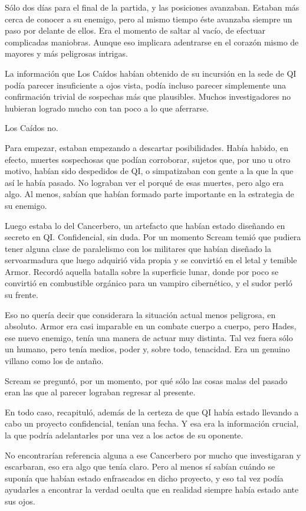 Sólo dos días para el final de la partida, y las posiciones avanzaban. Estaban más cerca de conocer a su enemigo, pero al mismo tiempo éste avanzaba siempre un paso por delante de ellos. Era el momento de saltar al vacío, de efectuar complicadas maniobras. Aunque eso implicara adentrarse en el corazón mismo de mayores y más peligrosas intrigas.

\fancyparbreak
La información que Los Caídos habían obtenido de su incursión en la sede de QI podía parecer insuficiente a ojos vista, podía incluso parecer simplemente una confirmación trivial de sospechas más que plausibles. Muchos investigadores no hubieran logrado mucho con tan poco a lo que aferrarse.

Los Caídos no.

Para empezar, estaban empezando a descartar posibilidades. Había habido, en efecto, muertes sospechosas que podían corroborar, sujetos que, por uno u otro motivo, habían sido despedidos de QI, o simpatizaban con gente a la que la que así le había pasado. No lograban ver el porqué de esas muertes, pero algo era algo. Al menos, sabían que habían formado parte importante en la estrategia de su enemigo.

Luego estaba lo del Cancerbero, un artefacto que habían estado diseñando en secreto en QI. Confidencial, sin duda. Por un momento Scream temió que pudiera tener alguna clase de paralelismo con los militares que habían diseñado la servoarmadura que luego adquirió vida propia y se convirtió en el letal y temible Armor. Recordó aquella batalla sobre la superficie lunar, donde por poco se convirtió en combustible orgánico para un vampiro cibernético, y el sudor perló su frente.

Eso no quería decir que considerara la situación actual menos peligrosa, en absoluto. Armor era casi imparable en un combate cuerpo a cuerpo, pero Hades, ese nuevo enemigo, tenía una manera de actuar muy distinta. Tal vez fuera sólo un humano, pero tenía medios, poder y, sobre todo, tenacidad. Era un genuino villano como los de antaño.

Scream se preguntó, por un momento, por qué sólo las cosas malas del pasado eran las que al parecer lograban regresar al presente.

En todo caso, recapituló, además de la certeza de que QI había estado llevando a cabo un proyecto confidencial, tenían una fecha. Y esa era la información crucial, la que podría adelantarles por una vez a los actos de su oponente.

No encontrarían referencia alguna a ese Cancerbero por mucho que investigaran y escarbaran, eso era algo que tenía claro. Pero al menos sí sabían cuándo se suponía que habían estado enfrascados en dicho proyecto, y eso tal vez podía ayudarles a encontrar la verdad oculta que en realidad siempre había estado ante sus ojos.


